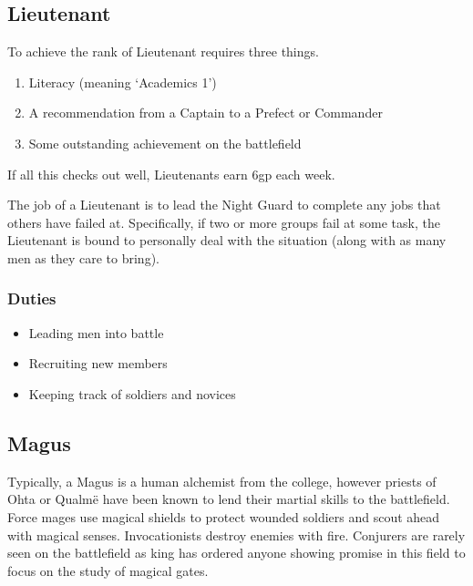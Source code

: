 \begin{multicols}{2}
\subsection{Lieutenant}

To achieve the rank of Lieutenant requires three things.

\begin{enumerate}

	\item{Literacy (meaning `Academics 1')}
	\item{A recommendation from a Captain to a Prefect or Commander}
	\item{Some outstanding achievement on the battlefield}

\end{enumerate}

\noindent
If all this checks out well, Lieutenants earn 6gp each week.

The job of a Lieutenant is to lead the Night Guard to complete any jobs that others have failed at.
Specifically, if two or more groups fail at some task, the Lieutenant is bound to personally deal with the situation (along with as many men as they care to bring).

\subsubsection{Duties}

\begin{itemize}

	\item{Leading men into battle}
	\item{Recruiting new members}
	\item{Keeping track of soldiers and novices}

\end{itemize}

\subsection{Magus}

Typically, a Magus is a human alchemist from the \gls{college}, however priests of Ohta or Qualm\"e have been known to lend their martial skills to the battlefield.
Force mages use magical shields to protect wounded soldiers and scout ahead with magical senses.
Invocationists destroy enemies with fire.
Conjurers are rarely seen on the battlefield as \gls{king} has ordered anyone showing promise in this field to focus on the study of magical gates.


\end{multicols}
